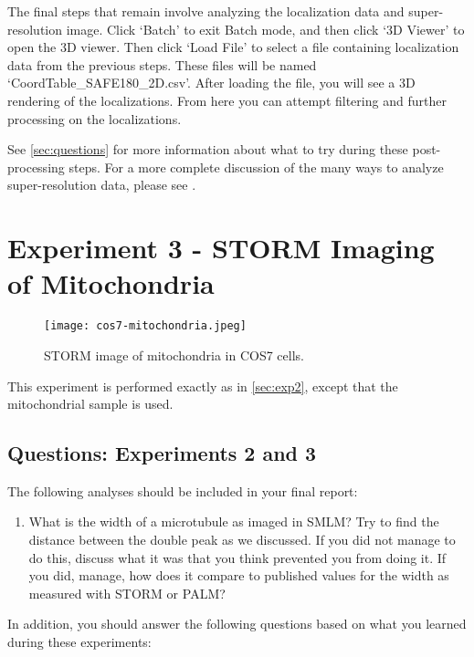 \documentclass[10pt,a4paper,oneside]{book}
\begin{document}
The final steps that remain involve analyzing the localization data and super-resolution image. Click `Batch' to exit Batch mode, and then click `3D Viewer' to open the 3D viewer. Then click `Load File' to select a file containing localization data from the previous steps. These files will be named `CoordTable\_SAFE180\_2D.csv'. After loading the file, you will see a 3D rendering of the localizations. From here you can attempt filtering and further processing on the localizations.

See \autoref{sec:questions} for more information about what to try during these post-processing steps. For a more complete discussion of the many ways to analyze super-resolution data, please see \cite{martens-frontiersinbioinformatics-2022}.

\section{Experiment 3 - STORM Imaging of Mitochondria}\label{sec:exp3}

\begin{figure}[ht]
    \centering
    \texttt{[image: cos7-mitochondria.jpeg]}
    \caption{STORM image of mitochondria in COS7 cells.}
    \label{fig:cos7-mitochondria}
\end{figure}

This experiment is performed exactly as in \autoref{sec:exp2}, except that the mitochondrial sample is used.

\subsection{Questions: Experiments 2 and 3}\label{sec:questions}

The following analyses should be included in your final report:

\begin{enumerate}
    \item What is the width of a microtubule as imaged in SMLM? Try to find the distance between the double peak as we discussed. If you did not manage to do this, discuss what it was that you think prevented you from doing it. If you did, manage, how does it compare to published values for the width as measured with STORM or PALM?
\end{enumerate}

In addition, you should answer the following questions based on what you learned during these experiments:
\end{document}
